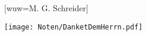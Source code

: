 [wuw={M. G. Schreider}]

\markboth{\songtitle}{\songtitle}

\beginverse
\endverse

\centering\texttt{[image: Noten/DanketDemHerrn.pdf]}

\endsong

\beginscripture

\endscripture

\begin{intersong}

\end{intersong}
